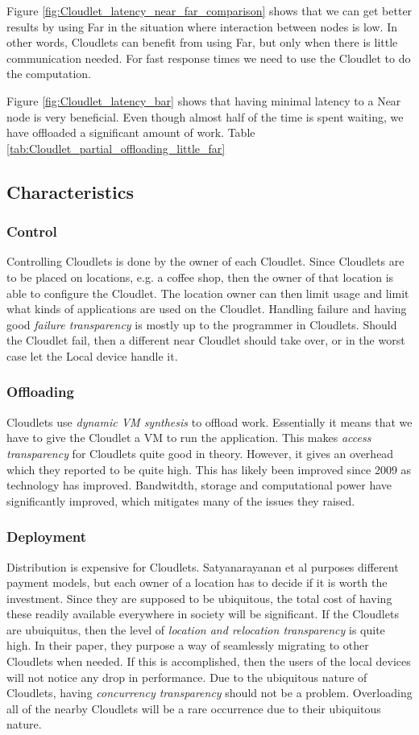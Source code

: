 Figure \ref{fig:Cloudlet_latency_near_far_comparison} shows that we can get better results by using Far in the situation where interaction between nodes is low. In other words, Cloudlets can benefit from using Far, but only when there is little communication needed. For fast response times we need to use the Cloudlet to do the computation. 

Figure \ref{fig:Cloudlet_latency_bar} shows that having minimal latency to a Near node is very beneficial. Even though almost half of the time is spent waiting, we have offloaded a significant amount of work. Table \ref{tab:Cloudlet_partial_offloading_little_far} 



\subsection{Characteristics}
\subsubsection{Control}
Controlling Cloudlets is done by the owner of each Cloudlet. Since Cloudlets are to be placed on locations, e.g. a coffee shop, then the owner of that location is able to configure the Cloudlet. The location owner can then limit usage and limit what kinds of applications are used on the Cloudlet. Handling failure and having good \textit{failure transparency} is mostly up to the programmer in Cloudlets. Should the Cloudlet fail, then a different near Cloudlet should take over, or in the worst case let the Local device handle it. 
\subsubsection{Offloading}
Cloudlets use \textit{dynamic VM synthesis} \cite{satyanarayanan_case_2009} to offload work. Essentially it means that we have to give the Cloudlet a VM to run the application. This makes \textit{access transparency} for Cloudlets quite good in theory. However, it gives an overhead which they reported to be quite high. This has likely been improved since 2009 as technology has improved. Bandwitdth, storage and computational power have significantly improved, which mitigates many of the issues they raised.
\subsubsection{Deployment}
Distribution is expensive for Cloudlets. Satyanarayanan et al\cite{satyanarayanan_case_2009} purposes different payment models, but each owner of a location has to decide if it is worth the investment. Since they are supposed to be ubiquitous, the total cost of having these readily available everywhere in society will be significant. If the Cloudlets are ubuiquitus, then the level of \textit{location and relocation transparency} is quite high. In their paper, they purpose a way of seamlessly migrating to other Cloudlets when needed. If this is accomplished, then the users of the local devices will not notice any drop in performance. Due to the ubiquitous nature of Cloudlets, having \textit{concurrency transparency} should not be a problem. Overloading all of the nearby Cloudlets will be a rare occurrence due to their ubiquitous nature.